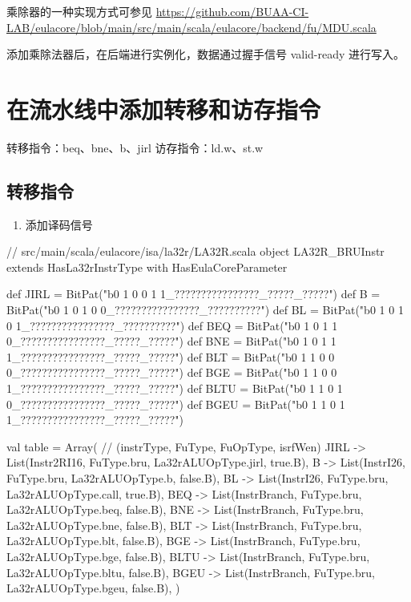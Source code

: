 乘除器的一种实现方式可参见 \url{https://github.com/BUAA-CI-LAB/eulacore/blob/main/src/main/scala/eulacore/backend/fu/MDU.scala}

添加乘除法器后，在后端进行实例化，数据通过握手信号 valid-ready 进行写入。

\section{在流水线中添加转移和访存指令}\label{sec:06-more-instructions-007}

转移指令：beq、bne、b、jirl
访存指令：ld.w、st.w

\subsection{转移指令}\label{sec:06-more-instructions-008}

\begin{enumerate}
\def\labelenumi{\arabic{enumi}.}
\tightlist
\item
  添加译码信号
\end{enumerate}

\begin{CodeBlock}[language=BookScala]
// src/main/scala/eulacore/isa/la32r/LA32R.scala
object LA32R_BRUInstr extends HasLa32rInstrType with HasEulaCoreParameter {
  def JIRL  = BitPat("b0 1 0 0 1 1_????????????????_?????_?????")
  def B     = BitPat("b0 1 0 1 0 0_????????????????_??????????")
  def BL    = BitPat("b0 1 0 1 0 1_????????????????_??????????")
  def BEQ   = BitPat("b0 1 0 1 1 0_????????????????_?????_?????")
  def BNE   = BitPat("b0 1 0 1 1 1_????????????????_?????_?????")
  def BLT   = BitPat("b0 1 1 0 0 0_????????????????_?????_?????")
  def BGE   = BitPat("b0 1 1 0 0 1_????????????????_?????_?????")
  def BLTU  = BitPat("b0 1 1 0 1 0_????????????????_?????_?????")
  def BGEU  = BitPat("b0 1 1 0 1 1_????????????????_?????_?????")

  val table = Array( // (instrType, FuType, FuOpType, isrfWen)
    JIRL      -> List(Instr2RI16, FuType.bru, La32rALUOpType.jirl, true.B),
    B         -> List(InstrI26, FuType.bru, La32rALUOpType.b, false.B),
    BL        -> List(InstrI26, FuType.bru, La32rALUOpType.call, true.B),
    BEQ       -> List(InstrBranch, FuType.bru, La32rALUOpType.beq, false.B),
    BNE       -> List(InstrBranch, FuType.bru, La32rALUOpType.bne, false.B),
    BLT       -> List(InstrBranch, FuType.bru, La32rALUOpType.blt, false.B),
    BGE       -> List(InstrBranch, FuType.bru, La32rALUOpType.bge, false.B),
    BLTU      -> List(InstrBranch, FuType.bru, La32rALUOpType.bltu, false.B),
    BGEU      -> List(InstrBranch, FuType.bru, La32rALUOpType.bgeu, false.B),
  )
}
\end{CodeBlock}

